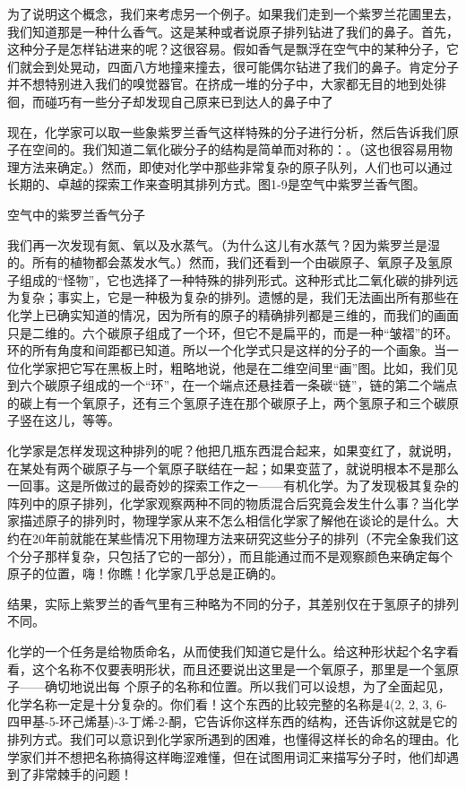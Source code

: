 \documentclass[12pt,oneside]{book}
\begin{document}
\begin{common-format}
为了说明这个概念，我们来考虑另一个例子。如果我们走到一个紫罗兰花圃里去，我们知道那是一种什么香气。这是某种或者说原子排列钻进了我们的鼻子。首先，这种分子是怎样钻进来的呢？这很容易。假如香气是飘浮在空气中的某种分子，它们就会到处晃动，四面八方地撞来撞去，很可能偶尔钻进了我们的鼻子。肯定分子并不想特别进入我们的嗅觉器官。在挤成一堆的分子中，大家都无目的地到处徘徊，而碰巧有一些分子却发现自己原来已到达人的鼻子中了

现在，化学家可以取一些象紫罗兰香气这样特殊的分子进行分析，然后告诉我们原子在空间的。我们知道二氧化碳分子的结构是简单而对称的：。（这也很容易用物理方法来确定。）然而，即使对化学中那些非常复杂的原子队列，人们也可以通过长期的、卓越的探索工作来查明其排列方式。图1-9是空气中紫罗兰香气图。
\begin{fig}{空气中的紫罗兰香气分子}
\caption{空气中的紫罗兰香气分子}
\label{fig:空气中的紫罗兰香气分子}
\end{fig}
我们再一次发现有氮、氧以及水蒸气。（为什么这儿有水蒸气？因为紫罗兰是湿的。所有的植物都会蒸发水气。）然而，我们还看到一个由碳原子、氧原子及氢原子组成的“怪物”，它也选择了一种特殊的排列形式。这种形式比二氧化碳的排列远为复杂；事实上，它是一种极为复杂的排列。遗憾的是，我们无法画出所有那些在化学上已确实知道的情况，因为所有的原子的精确排列都是三维的，而我们的画面只是二维的。六个碳原子组成了一个环，但它不是扁平的，而是一种“皱褶”的环。环的所有角度和间距都已知道。所以一个化学式只是这样的分子的一个画象。当一位化学家把它写在黑板上时，粗略地说，他是在二维空间里“画”图。比如，我们见到六个碳原子组成的一个“环”，在一个端点还悬挂着一条碳“链”，链的第二个端点的碳上有一个氧原子，还有三个氢原子连在那个碳原子上，两个氢原子和三个碳原子竖在这儿，等等。

化学家是怎样发现这种排列的呢？他把几瓶东西混合起来，如果变红了，就说明，在某处有两个碳原子与一个氧原子联结在一起；如果变蓝了，就说明根本不是那么一回事。这是所做过的最奇妙的探索工作之一——有机化学。为了发现极其复杂的阵列中的原子排列，化学家观察两种不同的物质混合后究竟会发生什么事？当化学家描述原子的排列时，物理学家从来不怎么相信化学家了解他在谈论的是什么。大约在20年前就能在某些情况下用物理方法来研究这些分子的排列（不完全象我们这个分子那样复杂，只包括了它的一部分），而且能通过而不是观察颜色来确定每个原子的位置，嗨！你瞧！化学家几乎总是正确的。

结果，实际上紫罗兰的香气里有三种略为不同的分子，其差别仅在于氢原子的排列不同。

化学的一个任务是给物质命名，从而使我们知道它是什么。给这种形状起个名字看看，这个名称不仅要表明形状，而且还要说出这里是一个氧原子，那里是一个氢原子——确切地说出每 个原子的名称和位置。所以我们可以设想，为了全面起见，化学名称一定是十分复杂的。你们看！这个东西的比较完整的名称是4(2, 2, 3, 6-四甲基-5-环己烯基)-3-丁烯-2-酮，它告诉你这样东西的结构，还告诉你这就是它的排列方式。我们可以意识到化学家所遇到的困难，也懂得这样长的命名的理由。化学家们并不想把名称搞得这样晦涩难懂，但在试图用词汇来描写分子时，他们却遇到了非常棘手的问题！


\end{common-format}
\end{document}
